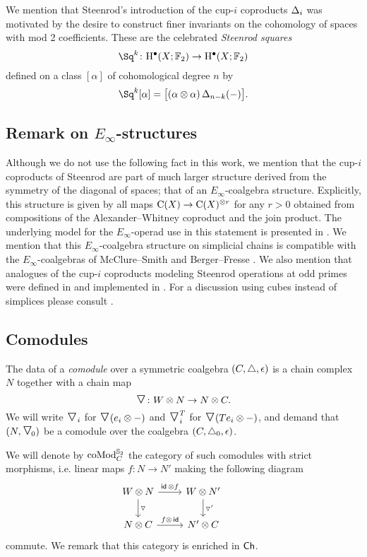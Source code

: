 We mention that Steenrod's introduction of the cup-$i$ coproducts $\operatorname{\Delta}_i$ was motivated by the desire to construct finer invariants on the cohomology of spaces with mod 2 coefficients.
These are the celebrated \textit{Steenrod squares}
\[
\Sq^k \colon \rH^\bullet(X; \Ftwo) \to \rH^\bullet(X; \Ftwo)
\]
defined on a class $[\alpha]$ of cohomological degree $n$ by
\[
\Sq^k [\alpha] = \big[ (\alpha \ot \alpha) \copr_{n-k}(-) \big].
\]

\subsection{Remark on $E_\infty$-structures}

Although we do not use the following fact in this work, we mention that the cup-$i$ coproducts of Steenrod are part of much larger structure derived from the symmetry of the diagonal of spaces; that of an $E_\infty$-coalgebra structure.
Explicitly, this structure is given by all maps $\operatorname{C}(X) \to \operatorname{C}(X)^{\otimes r}$ for any $r > 0$ obtained from compositions of the Alexander--Whitney coproduct and the join product.
The underlying model for the $E_\infty$-operad use in this statement is presented in \cite{medina2020prop1, medina2021prop2}.
We mention that this $E_\infty$-coalgebra structure on simplicial chains is compatible with the $E_\infty$-coalgebras of McClure--Smith \cite{mcclure2003multivariable} and Berger--Fresse \cite{berger2004combinatorial}.
We also mention that analogues of the cup-$i$ coproducts modeling Steenrod operations at odd primes were defined in \cite{medina2021may_st} and implemented in \cite{medina2021comch}.
For a discussion using cubes instead of simplices please consult \cite{medina2021cubical}.

\subsection{Comodules}

The data of a \textit{comodule} over a symmetric coalgebra $(C, \triangle, \operatorname{\epsilon})$ is a chain complex $N$ together with a chain map
\[
\text{\Large$\triangledown$} \colon W \otimes N \to N \otimes C.
\]
We will write $\text{\Large$\triangledown$}_i$ for $\text{\Large$\triangledown$}(e_i \otimes -)$ and $\text{\Large$\triangledown$}_i^T$ for $\text{\Large$\triangledown$}(Te_i \otimes -)$, and demand that $(N, \text{\Large$\triangledown$}_{\!0})$ be a comodule over the coalgebra $(C, \triangle_0, \operatorname{\epsilon})$.

We will denote by $\operatorname{coMod}_C^{\mathbb{S}_2}$ the category of such comodules with strict morphisms, i.e. linear maps $f \colon N \to N'$ making the following diagram
\[
\begin{tikzcd}
	W \ot N \arrow[d, "\triangledown"] \arrow[r, "\id\, \ot f"] &
	W \ot N' \arrow[d, "\triangledown'"] & \\
	N \ot C \arrow[r, "f \ot\, \id"] &
	N' \ot C
\end{tikzcd}
\]
commute.
We remark that this category is enriched in $\mathsf{Ch}$.

